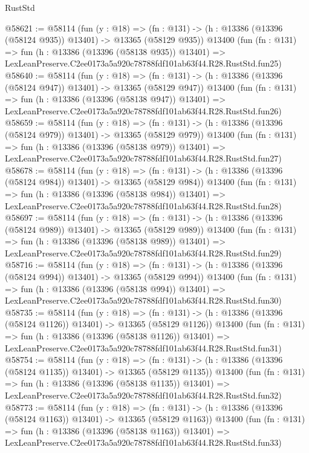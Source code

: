 \begin{lexlean}{RustStd}
\begin{coremodule}
@58621 := @58114
    (fun (y : @18) =>
    (fn : @131) -> (h : @13386 (@13396 (@58124 @935)) @13401) -> @13365 (@58129 @935))
    @13400
    (fun (fn : @131) =>
    fun (h : @13386 (@13396 (@58138 @935)) @13401) =>
    LexLeanPreserve.C2ee0173a5a920c78788fdf101ab63f44.R28.RustStd.fun25)
@58640 := @58114
    (fun (y : @18) =>
    (fn : @131) -> (h : @13386 (@13396 (@58124 @947)) @13401) -> @13365 (@58129 @947))
    @13400
    (fun (fn : @131) =>
    fun (h : @13386 (@13396 (@58138 @947)) @13401) =>
    LexLeanPreserve.C2ee0173a5a920c78788fdf101ab63f44.R28.RustStd.fun26)
@58659 := @58114
    (fun (y : @18) =>
    (fn : @131) -> (h : @13386 (@13396 (@58124 @979)) @13401) -> @13365 (@58129 @979))
    @13400
    (fun (fn : @131) =>
    fun (h : @13386 (@13396 (@58138 @979)) @13401) =>
    LexLeanPreserve.C2ee0173a5a920c78788fdf101ab63f44.R28.RustStd.fun27)
@58678 := @58114
    (fun (y : @18) =>
    (fn : @131) -> (h : @13386 (@13396 (@58124 @984)) @13401) -> @13365 (@58129 @984))
    @13400
    (fun (fn : @131) =>
    fun (h : @13386 (@13396 (@58138 @984)) @13401) =>
    LexLeanPreserve.C2ee0173a5a920c78788fdf101ab63f44.R28.RustStd.fun28)
@58697 := @58114
    (fun (y : @18) =>
    (fn : @131) -> (h : @13386 (@13396 (@58124 @989)) @13401) -> @13365 (@58129 @989))
    @13400
    (fun (fn : @131) =>
    fun (h : @13386 (@13396 (@58138 @989)) @13401) =>
    LexLeanPreserve.C2ee0173a5a920c78788fdf101ab63f44.R28.RustStd.fun29)
@58716 := @58114
    (fun (y : @18) =>
    (fn : @131) -> (h : @13386 (@13396 (@58124 @994)) @13401) -> @13365 (@58129 @994))
    @13400
    (fun (fn : @131) =>
    fun (h : @13386 (@13396 (@58138 @994)) @13401) =>
    LexLeanPreserve.C2ee0173a5a920c78788fdf101ab63f44.R28.RustStd.fun30)
@58735 := @58114
    (fun (y : @18) =>
    (fn : @131) -> (h : @13386 (@13396 (@58124 @1126)) @13401) -> @13365 (@58129 @1126))
    @13400
    (fun (fn : @131) =>
    fun (h : @13386 (@13396 (@58138 @1126)) @13401) =>
    LexLeanPreserve.C2ee0173a5a920c78788fdf101ab63f44.R28.RustStd.fun31)
@58754 := @58114
    (fun (y : @18) =>
    (fn : @131) -> (h : @13386 (@13396 (@58124 @1135)) @13401) -> @13365 (@58129 @1135))
    @13400
    (fun (fn : @131) =>
    fun (h : @13386 (@13396 (@58138 @1135)) @13401) =>
    LexLeanPreserve.C2ee0173a5a920c78788fdf101ab63f44.R28.RustStd.fun32)
@58773 := @58114
    (fun (y : @18) =>
    (fn : @131) -> (h : @13386 (@13396 (@58124 @1163)) @13401) -> @13365 (@58129 @1163))
    @13400
    (fun (fn : @131) =>
    fun (h : @13386 (@13396 (@58138 @1163)) @13401) =>
    LexLeanPreserve.C2ee0173a5a920c78788fdf101ab63f44.R28.RustStd.fun33)

\end{coremodule}
\end{lexlean}
